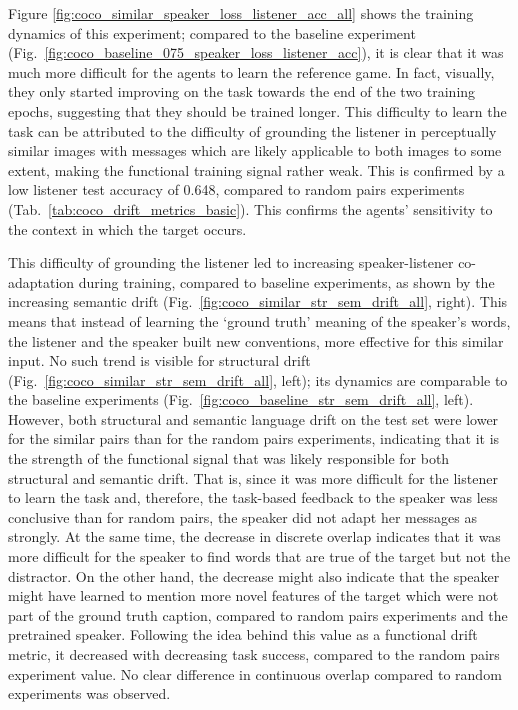 Figure \ref{fig:coco_similar_speaker_loss_listener_acc_all} shows the training dynamics of this experiment; compared to the baseline experiment (Fig.~\ref{fig:coco_baseline_075_speaker_loss_listener_acc}), it is clear that it was much more difficult for the agents to learn the reference game. In fact, visually, they only started improving on the task towards the end of the two training epochs, suggesting that they should be trained longer. This difficulty to learn the task can be attributed to the difficulty of grounding the listener in perceptually similar images with messages which are likely applicable to both images to some extent, making the functional training signal rather weak. This is confirmed by a low listener test accuracy of 0.648, compared to random pairs experiments (Tab.~\ref{tab:coco_drift_metrics_basic}). This confirms the agents' sensitivity to the context in which the target occurs. 

This difficulty of grounding the listener led to increasing speaker-listener co-adaptation during training, compared to baseline experiments, as shown by the increasing semantic drift (Fig.~\ref{fig:coco_similar_str_sem_drift_all}, right). This means that instead of learning the `ground truth' meaning of the speaker's words, the listener and the speaker built new conventions, more effective for this similar input. No such trend is visible for structural drift (Fig.~\ref{fig:coco_similar_str_sem_drift_all}, left); its dynamics are comparable to the baseline experiments (Fig.~\ref{fig:coco_baseline_str_sem_drift_all}, left). 
However, both structural and semantic language drift on the test set were lower for the similar pairs than for the random pairs experiments, indicating that it is the strength of the functional signal that was likely responsible for both structural and semantic drift. That is, since it was more difficult for the listener to learn the task and, therefore, the task-based feedback to the speaker was less conclusive than for random pairs, the speaker did not adapt her messages as strongly.
At the same time, the decrease in discrete overlap indicates that it was more difficult for the speaker to find words that are true of the target but not the distractor. On the other hand, the decrease might also indicate that the speaker might have learned to mention more novel features of the target which were not part of the ground truth caption, compared to random pairs experiments and the pretrained speaker. Following the idea behind this value as a functional drift metric, it decreased with decreasing task success, compared to the random pairs experiment value. No clear difference in continuous overlap compared to random experiments was observed.

